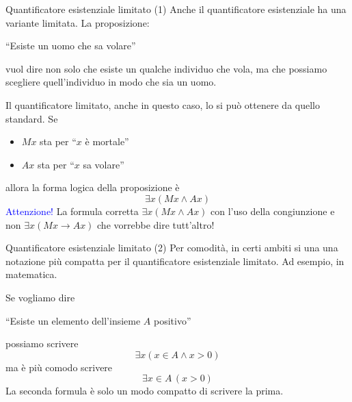\documentclass[10pt,dvipsnames,xcolor=table,handout]{beamer}
\begin{document}
\begin{frame}{Quantificatore esistenziale limitato (1)}
    Anche il quantificatore esistenziale ha una variante limitata. La proposizione:
    \begin{center}
        ``Esiste un uomo che sa volare''
    \end{center}
    vuol dire non solo che esiste un qualche individuo che vola, ma che possiamo scegliere quell'individuo in modo che sia un uomo.

    \medskip
    Il quantificatore limitato, anche in questo caso, lo si può ottenere da quello standard. Se
    \begin{itemize}
        \item $Mx$ sta per ``$x$ è mortale''
        \item $Ax$ sta per ``$x$ sa volare''
    \end{itemize}
    allora la forma logica della proposizione è
    \[
        \exists x (Mx \wedge Ax)
    \]
    \textcolor{Blue}{Attenzione!} La formula corretta $\exists x (Mx \land Ax)$ con l'uso della \alert{congiunzione} e non  $\exists x (Mx \to Ax)$ che vorrebbe dire tutt'altro!
\end{frame}

\begin{frame}{Quantificatore esistenziale limitato (2)}
    Per comodità, in certi ambiti si una una notazione più compatta per il quantificatore esistenziale limitato. Ad esempio, in matematica.
    \begin{example}
        Se vogliamo dire
        \begin{center}
            ``Esiste un elemento dell'insieme $A$ positivo''
        \end{center}
        possiamo scrivere
        \[
            \exists x (x \in A \wedge x > 0)
        \]
        ma è più comodo scrivere
        \[
            \exists x \in A \, (x > 0)
        \]
        La seconda formula è solo un modo compatto di scrivere la prima.
    \end{example}
\end{frame}
\end{document}

